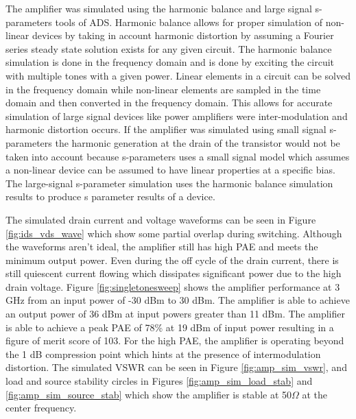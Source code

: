 The amplifier was simulated using the harmonic balance and large signal s-parameters tools of ADS. Harmonic balance allows for proper simulation of non-linear devices by taking in account harmonic distortion by assuming a Fourier series steady state solution exists for any given circuit. The harmonic balance simulation is done in the frequency domain and is done by exciting the circuit with multiple tones with a given power. Linear elements in a circuit can be solved in the frequency domain while non-linear elements are sampled in the time domain and then converted in the frequency domain. This allows for accurate simulation of large signal devices like power amplifiers were inter-modulation and harmonic distortion occurs. If the amplifier was simulated using small signal s-parameters the harmonic generation at the drain of the transistor would not be taken into account because s-parameters uses a small signal model which assumes a non-linear device can be assumed to have linear properties at a specific bias. The large-signal s-parameter simulation uses the harmonic balance simulation results to produce s parameter results of a device.

The simulated drain current and voltage waveforms can be seen in Figure \ref{fig:ids_vds_wave} which show some partial overlap during switching. Although the waveforms aren't ideal, the amplifier still has high PAE and meets the minimum output power. Even during the off cycle of the drain current, there is still quiescent current flowing which dissipates significant power due to the high drain voltage. Figure \ref{fig:singletonesweep} shows the amplifier performance at 3 GHz from an input power of -30 dBm to 30 dBm. The amplifier is able to achieve an output power of 36 dBm at input powers greater than 11 dBm. The amplifier is able to achieve a peak PAE of 78\% at 19 dBm of input power resulting in a figure of merit score of 103. For the high PAE, the amplifier is operating beyond the 1 dB compression point which hints at the presence of intermodulation distortion. The simulated VSWR can be seen in Figure \ref{fig:amp_sim_vswr}, and load and source stability circles in Figures \ref{fig:amp_sim_load_stab} and \ref{fig:amp_sim_source_stab} which show the amplifier is stable at 50$\Omega$ at the center frequency.



